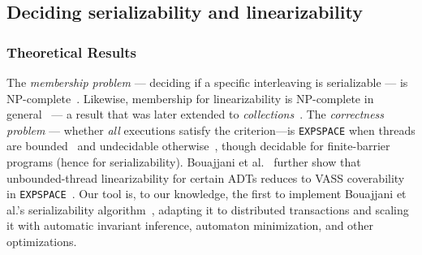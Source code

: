 \subsection{Deciding serializability and linearizability}

\subsubsection{Theoretical Results}
The \emph{membership problem} --- deciding if a specific interleaving is serializable --- is NP-complete~\cite{Pa79,BiEn19}. Likewise, membership for linearizability is NP-complete in general~\cite{GiKo97} --- a result that was later 
extended to \textit{collections}~\cite{EmEn18}. The \emph{correctness problem} --- whether \emph{all} executions satisfy the criterion—is \texttt{EXPSPACE} when threads are bounded~\cite{AlMcPe96} and undecidable otherwise~\cite{BoEmEnHa13}, though decidable for finite-barrier programs (hence for serializability). Bouajjani et al.~\cite{BoEmEnHa18} further show that unbounded-thread linearizability for certain ADTs reduces to VASS coverability in \texttt{EXPSPACE}~\cite{Ra78}. Our tool is, to our knowledge, the first to implement Bouajjani et al.’s serializability algorithm~\cite{BoEmEnHa13}, adapting it to distributed transactions and scaling it with automatic invariant inference, automaton minimization, and other optimizations. 

